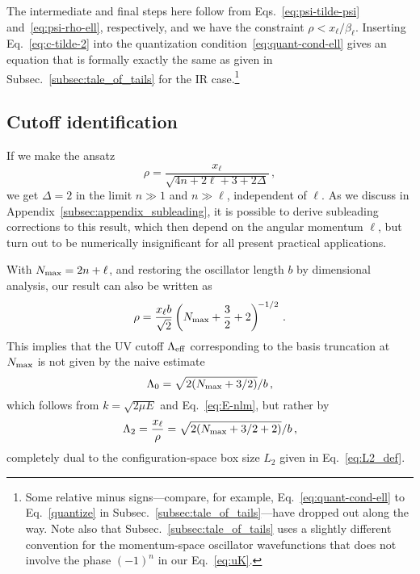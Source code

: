   The intermediate and final steps here follow from
  Eqs.~\eqref{eq:psi-tilde-psi} and~\eqref{eq:psi-rho-ell},
  respectively, and we have the constraint $\rho<x_\ell/\beta_\ell$.
  Inserting Eq.~\eqref{eq:c-tilde-2} into the quantization
  condition~\eqref{eq:quant-cond-ell} gives an equation that is formally
  exactly the same as given in Subsec.~\ref{subsec:tale_of_tails} for the
  IR case.\footnote{Some relative minus signs---compare, for example,
  Eq.~\eqref{eq:quant-cond-ell} to Eq.~\eqref{quantize} in
  Subsec.~\ref{subsec:tale_of_tails}---have dropped out along the way.
  Note also that Subsec.~\ref{subsec:tale_of_tails} uses a slightly
  different convention for the momentum-space oscillator wavefunctions
  that does not involve the phase $(-1)^n$ in our Eq.~\eqref{eq:uK}.}

  \subsection{Cutoff identification}

  If we make the ansatz
  \begin{equation}
  \rho = \frac{x_\ell}{\sqrt{4n+2\ell+3+2\Delta}} \,,
  \label{eq:rho-ansatz}
  \end{equation}
  we get $\Delta=2$ in the limit $n \gg 1$ and $n\gg\ell$, independent
  of $\ell$.  As we discuss in Appendix~\ref{subsec:appendix_subleading},
  it is possible to
  derive subleading corrections to this result, which then depend on the
  angular momentum $\ell$, but turn out to be numerically insignificant
  for all present practical applications.

  With ${N_{\mathrm{max}}}=2n+\ell$, and restoring the oscillator length $b$ by
  dimensional analysis, our result can also be written as
  \begin{equation}
   \rho = \frac{x_\ell b}{\sqrt2}\left({N_{\mathrm{max}}}+\frac32+2\right)^{\!-1/2} \,.
  \label{eq:rho-Nmax}
  \end{equation}
  This implies that the UV cutoff $\Lambda_{\rm eff}$ corresponding to the basis
  truncation at ${N_{\mathrm{max}}}$ is not given by the naive estimate
  \begin{equation}
   \Lambda_0 = \sqrt{2({N_{\mathrm{max}}}+3/2)}/b \,,
  \label{eq:Lambda-0-app}
  \end{equation}
  which follows from $k = \sqrt{2\mu E}$ and Eq.~\eqref{eq:E-nlm},
  but rather by
  \begin{equation}
   \Lambda_2 = \frac{x_\ell}{\rho} = \sqrt{2({N_{\mathrm{max}}}+3/2+2)}/b \,,
  \label{eq:Lambda-2-app}
  \end{equation}
  completely dual to the configuration-space box size $L_2$ given in
  Eq.~\eqref{eq:L2_def}.

